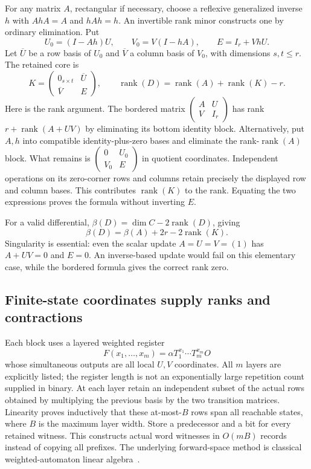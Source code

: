 For any matrix $A$, rectangular if necessary, choose a reflexive generalized
inverse $h$ with $AhA=A$ and $hAh=h$. An invertible rank minor constructs one
by ordinary elimination. Put
\[
 U_0=(I-Ah)U,\qquad V_0=V(I-hA),\qquad E=I_r+VhU.
\]
Let $\overline U$ be a row basis of $U_0$ and $\overline V$ a column basis
of $V_0$, with dimensions $s,t\le r$. The retained core is
\[
 K=\begin{pmatrix}0_{s\times t}&\overline U\\
                   \overline V&E\end{pmatrix},\qquad
 \operatorname{rank}(D)=\operatorname{rank}(A)+\operatorname{rank}(K)-r.
\]
Here is the rank argument. The bordered matrix
$\left(\begin{smallmatrix}A&U\\V&I_r\end{smallmatrix}\right)$ has rank
$r+\operatorname{rank}(A+UV)$ by eliminating its bottom identity block.
Alternatively, put $A,h$ into compatible identity-plus-zero bases and
eliminate the rank-$\operatorname{rank}(A)$ block. What remains is
$\left(\begin{smallmatrix}0&U_0\\V_0&E\end{smallmatrix}\right)$ in quotient
coordinates. Independent operations on its zero-corner rows and columns
retain precisely the displayed row and column bases. This contributes
$\operatorname{rank}(K)$ to the rank. Equating the two expressions proves
the formula without inverting $E$.

For a valid differential, $\beta(D)=\dim C-2\operatorname{rank}(D)$, giving
\[
 \beta(D)=\beta(A)+2r-2\operatorname{rank}(K).
\]
Singularity is essential: even the scalar update $A=U=V=(1)$ has
$A+UV=0$ and $E=0$. An inverse-based update would fail on this elementary
case, while the bordered formula gives the correct rank zero.

\subsection{Finite-state coordinates supply ranks and contractions}
Each block uses a layered weighted register
\[
 F(x_1,\ldots,x_m)=\alpha T_1^{x_1}\cdots T_m^{x_m}O
\]
whose simultaneous outputs are all local $U,V$ coordinates. All $m$ layers
are explicitly listed; the register length is not an exponentially large
repetition count supplied in binary. At each layer retain an independent
subset of the actual rows obtained by multiplying the previous basis by the
two transition matrices. Linearity proves inductively that these at-most-$B$
rows span all reachable states, where $B$ is the maximum layer width.
Store a predecessor and a bit for every retained witness. This constructs
actual word witnesses in $O(mB)$ records instead of copying all prefixes.
The underlying forward-space method is classical weighted-automaton
linear algebra~\cite{kiefer-register}.

